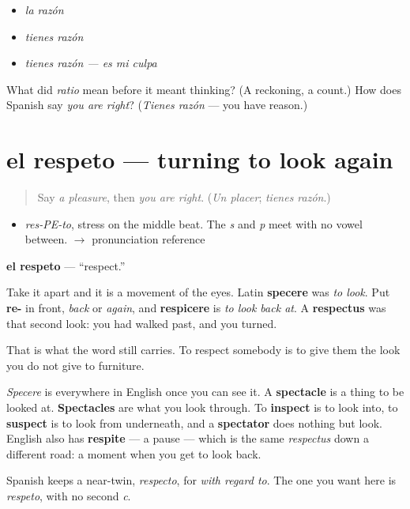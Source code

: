 \begin{itemize}
\raggedright
  \item \emph{la razón}
  \item \emph{tienes razón}
  \item \emph{tienes razón — es mi culpa}
\end{itemize}

\begin{tcolorbox}[breakable,colback=teal!4,colframe=teal!35!black,title={Before you move on}]
What did \emph{ratio} mean before it meant thinking? (A reckoning, a count.) How does Spanish say \emph{you are right}? (\emph{Tienes razón} — you have reason.)
\end{tcolorbox}
\section[el respeto]{el respeto — turning to look again}

\label{lesson:ES-C321-respeto}



\begin{quote}
Say \emph{a pleasure}, then \emph{you are right}. (\emph{Un placer}; \emph{tienes razón}.)
\end{quote}

\begin{sounds}
\begin{itemize}
\raggedright
  \item \emph{res-PE-to}, stress on the middle beat. The \emph{s} and \emph{p} meet with no vowel between. $\to$ pronunciation reference
\end{itemize}
\end{sounds}

\begin{cousinweb}
\textbf{el respeto} — \textquotedblleft{}respect.\textquotedblright{}

Take it apart and it is a movement of the eyes. Latin \textbf{specere} was \emph{to look}. Put \textbf{re-} in front, \emph{back} or \emph{again}, and \textbf{respicere} is \emph{to look back at}. A \textbf{respectus} was that second look: you had walked past, and you turned.

That is what the word still carries. To respect somebody is to give them the look you do not give to furniture.

\emph{Specere} is everywhere in English once you can see it. A \textbf{spectacle} is a thing to be looked at. \textbf{Spectacles} are what you look through. To \textbf{inspect} is to look into, to \textbf{suspect} is to look from underneath, and a \textbf{spectator} does nothing but look. English also has \textbf{respite} — a pause — which is the same \emph{respectus} down a different road: a moment when you get to look back.

Spanish keeps a near-twin, \emph{respecto}, for \emph{with regard to}. The one you want here is \emph{respeto}, with no second \emph{c}.
\end{cousinweb}

